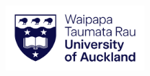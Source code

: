 \begin{titlepage}
\hspace*{-0.75cm}%
\includegraphics[width=0.4\textwidth]{uoa_style_guides/Primary Logo_PNG/Large Primary Logo_PNG/UoA-Logo-Primary-RGB-Large.png}
\vspace{1.5cm}
    \begin{center}

        \large

        \begingroup
            \Large
            \color{CTtitle}\spacedallcaps{\myTitle} \\ \bigskip
        \endgroup

        \vspace{3cm} %

        {\centering
            \spacedlowsmallcaps{\myName} \par
        }

        \vfill

        \small

    \end{center}
\end{titlepage}
